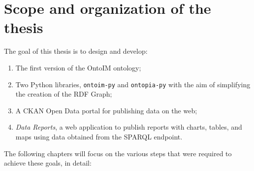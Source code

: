 \section{Scope and organization of the thesis}
\label{sec:thesis-organization}

The goal of this thesis is to design and develop:

\begin{enumerate}
  \item The first version of the \ac{OntoIM} ontology;
  \item Two Python libraries, \verb#ontoim-py# and \verb#ontopia-py# with the aim of simplifying the creation of the \ac{RDF} Graph;
  \item A CKAN Open Data portal for publishing data on the web;
  \item \textit{Data Reports}, a web application to publish reports with charts, tables, and maps using data obtained from the \ac{SPARQL} endpoint.
\end{enumerate}

The following chapters will focus on the various steps that were required to achieve these goals, in detail:

